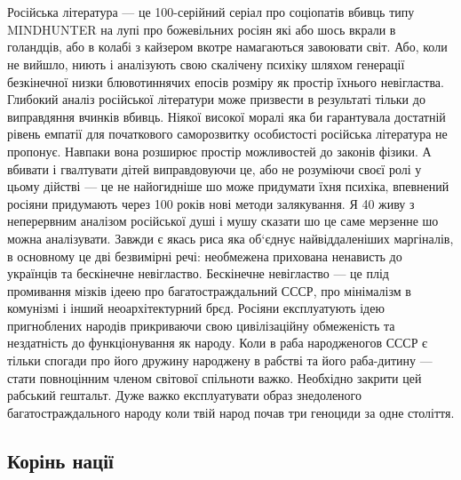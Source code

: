 \\
\\
Російська література — це 100-серійний серіал про соціопатів вбивць типу MINDHUNTER на лупі про божевільних росіян які або шось вкрали в голандців, або в колабі з кайзером вкотре намагаються завоювати світ. Або, коли не вийшло, ниють і аналізують свою скалічену психіку шляхом генерації безкінечної низки блювотиннячих епосів розміру як простір їхнього невігластва. Глибокий аналіз російської літератури може призвести в результаті тільки до виправдяння вчинків вбивць. Ніякої високої моралі яка би гарантувала достатній рівень емпатії для початкового саморозвитку особистості російська література не пропонує. Навпаки вона розширює простір можливостей до законів фізики. А вбивати і гвалтувати дітей виправдовуючи це, або не розуміючи своєї ролі у цьому дійстві — це не найогидніше шо може придумати їхня психіка, впевнений росіяни придумають через 100 років нові методи залякування. Я 40 живу з неперервним аналізом російської душі і мушу сказати шо це саме мерзенне шо можна аналізувати. Завжди є якась риса яка об‘єднує найвіддаленіших маргіналів, в основному це дві безвимірні речі: необмежена прихована ненависть до українців та бескінечне невігластво. Бескінечне невігластво — це плід промивання мізків ідеею про багатостраждальний СССР, про мінімалізм в комунізмі і інший неоархітектурний брєд. Росіяни експлуатують ідею пригноблених народів прикриваючи свою цивілізаційну обмеженість та нездатність до функціонування як народу. Коли в раба народженогов СССР є тільки спогади про його дружину народжену в рабстві та його раба-дитину — стати повноцінним членом світової спільноти важко. Необхідно закрити цей рабський гештальт. Дуже важко експлуатувати образ знедоленого багатостраждального народу коли твій народ почав три геноциди за одне століття.\\

\subsection{Корінь нації}


